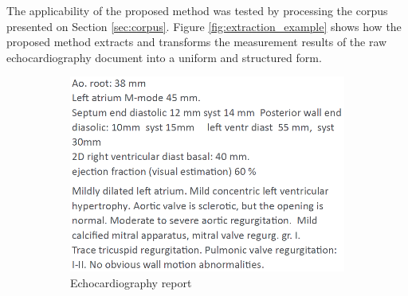 The applicability of the proposed method was tested by processing the corpus presented on Section \ref{sec:corpus}. Figure \ref{fig:extraction_example} shows how the proposed method extracts and transforms the measurement results of the raw echocardiography document into a uniform and structured form. 

\begin{figure}[h]
	\centering
        \captionsetup{justification=centering}
	\begin{subfigure}[b]{0.60\textwidth}
		\centering
		\includegraphics[width=\textwidth]{assets/figures/text_mining/corpus/raw_echo_example.eps}
		\caption{Echocardiography report}
		\label{fig:extraction_example_a}
	\end{subfigure}
	\hfill
	\begin{subfigure}[b]{0.36\textwidth}
		\centering

\end{subfigure}
\end{figure}

